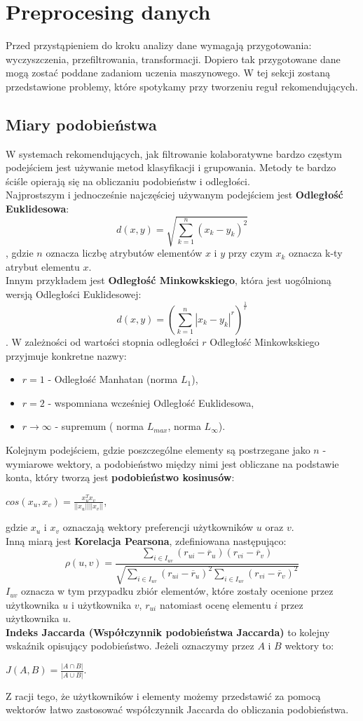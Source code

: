 \documentclass[12pt,a4paper]{report}
\begin{document}
\section{Preprocesing danych}
Przed przystąpieniem do kroku analizy dane wymagają przygotowania: wyczyszczenia, przefiltrowania, transformacji. Dopiero tak przygotowane dane mogą zostać poddane zadaniom uczenia maszynowego. W tej sekcji zostaną przedstawione problemy, które spotykamy przy tworzeniu reguł rekomendujących.
\subsection{Miary podobieństwa}
W systemach rekomendujących, jak filtrowanie kolaboratywne bardzo częstym podejściem jest używanie metod klasyfikacji i grupowania. Metody te bardzo ściśle opierają się na obliczaniu podobieństw i odległości.
\\Najprostszym i jednocześnie najczęściej używanym podejściem jest \textbf{Odległość Euklidesowa}:
$$d(x,y) = \sqrt{\sum_{k=1}^n (x_k-y_k)^2}$$, 
gdzie $n$ oznacza liczbę atrybutów elementów $x$ i $y$ przy czym $x_k$ oznacza k-ty atrybut elementu $x$. 
\\Innym przykładem jest \textbf{Odległość Minkowkskiego}, która jest uogólnioną wersją Odległości Euklidesowej:
$$d(x,y) = (\sum_{k=1}^n|x_k-y_k|^r)^{\frac{1}{r}}$$.
W zależności od wartości stopnia odległości $r$ Odległość Minkowkskiego przyjmuje konkretne nazwy:
\begin{itemize}
\item $r=1$ - Odległość Manhatan (norma $L_1$),
\item $r=2$ - wspomniana wcześniej Odległość Euklidesowa,
\item $r \longrightarrow \infty $ - supremum ( norma $L_{max}$, norma $L_{\infty}$). 
\end{itemize}
Kolejnym podejściem, gdzie poszczególne elementy są postrzegane jako $n$ - wymiarowe wektory, a podobieństwo między nimi jest obliczane na podstawie konta, który tworzą jest \textbf{podobieństwo kosinusów}:
\begin{center}
$cos(x_u, x_v) = \frac{x_u^{T}x_v}{||x_u|| ||x_v||}$,
\end{center}
gdzie $x_u$ i $x_v$ oznaczają wektory preferencji użytkowników $u$ oraz $v$.
\\Inną miarą jest \textbf{Korelacja Pearsona}, zdefiniowana następująco:
$$\rho(u,v) = \frac{\sum_{i\in I_{uv}}(r_{ui}-\overline{r}_u)(r_{vi}-\overline{r}_v)}{\sqrt{\sum_{i\in I_{uv}}(r_{ui}-\overline{r}_u)^2 \sum_{i\in I_{uv}}(r_{vi}-\overline{r}_v)^2}}$$
$I_{uv}$ oznacza w tym przypadku zbiór elementów, które zostały ocenione przez użytkownika $u$ i użytkownika $v$, $r_{ui}$ natomiast ocenę elementu $i$ przez użytkownika $u$.
\\\textbf{Indeks Jaccarda (Współczynnik podobieństwa Jaccarda)} to kolejny wskaźnik opisujący podobieństwo. Jeżeli oznaczymy przez $A$ i $B$ wektory to:
\begin{center}
$J(A,B)=\frac{|A\cap B|}{|A \cup B|}$.
\end{center}
Z racji tego, że użytkowników i elementy możemy przedstawić za pomocą wektorów łatwo zastosować współczynnik Jaccarda do obliczania podobieństwa.
\end{document}
